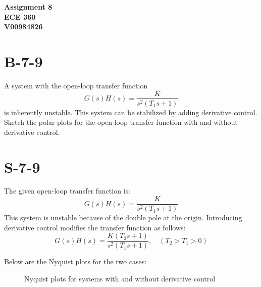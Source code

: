 \documentclass{article}
\begin{document}
\begin{center}
    \textbf{\LARGE Assignment 8} \\[1ex]
    \textbf{ECE 360} \\[1ex]
    \textbf{V00984826} \\[2ex]
\end{center}


\section*{B-7-9}
A system with the open-loop transfer function
\[
G(s)H(s) = \frac{K}{s^2 (T_1s + 1)}
\]
is inherently unstable. This system can be stabilized by adding derivative control. Sketch the polar plots for the open-loop transfer function with and without derivative control.

\section*{S-7-9}
The given open-loop transfer function is:
\[
G(s)H(s) = \frac{K}{s^2 (T_1s + 1)}
\]
This system is unstable because of the double pole at the origin. Introducing derivative control modifies the transfer function as follows:
\[
G(s)H(s) = \frac{K (T_2s + 1)}{s^2 (T_1s + 1)}, \quad (T_2 > T_1 > 0)
\]

Below are the Nyquist plots for the two cases:

\begin{figure}[H]
    \centering
    \caption{Nyquist plots for systems with and without derivative control}
\end{figure}
\end{document}
